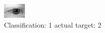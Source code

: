 \begin{figure}[h!]
\begin{center}
\includegraphics[width=0.60\columnwidth]{figures/ID362_class_1_target_2.png}
\end{center}
\caption{ Classification: 1 actual target: 2}
\label{fig:ID362_class_1_target_2}
\end{figure}
